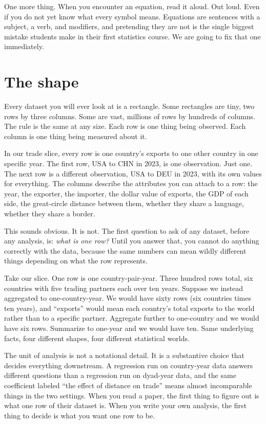 \documentclass[
  letterpaper,
  11pt,
  twoside,
  openany]{scrbook}
\begin{document}
One more thing. When you encounter an equation, read it aloud. Out loud.
Even if you do not yet know what every symbol means. Equations are
sentences with a subject, a verb, and modifiers, and pretending they are
not is the single biggest mistake students make in their first
statistics course. We are going to fix that one immediately.

\section{The shape}\label{the-shape}

Every dataset you will ever look at is a rectangle. Some rectangles are
tiny, two rows by three columns. Some are vast, millions of rows by
hundreds of columns. The rule is the same at any size. Each row is one
thing being observed. Each column is one thing being measured about it.

In our trade slice, every row is one country's exports to one other
country in one specific year. The first row, USA to CHN in 2023, is one
observation. Just one. The next row is a different observation, USA to
DEU in 2023, with its own values for everything. The columns describe
the attributes you can attach to a row: the year, the exporter, the
importer, the dollar value of exports, the GDP of each side, the
great-circle distance between them, whether they share a language,
whether they share a border.

This sounds obvious. It is not. The first question to ask of any
dataset, before any analysis, is: \emph{what is one row?} Until you
answer that, you cannot do anything correctly with the data, because the
same numbers can mean wildly different things depending on what the row
represents.

Take our slice. One row is one country-pair-year. Three hundred rows
total, six countries with five trading partners each over ten years.
Suppose we instead aggregated to one-country-year. We would have sixty
rows (six countries times ten years), and ``exports'' would mean each
country's total exports to the world rather than to a specific partner.
Aggregate further to one-country and we would have six rows. Summarize
to one-year and we would have ten. Same underlying facts, four different
shapes, four different statistical worlds.

The unit of analysis is not a notational detail. It is a substantive
choice that decides everything downstream. A regression run on
country-year data answers different questions than a regression run on
dyad-year data, and the same coefficient labeled ``the effect of
distance on trade'' means almost incomparable things in the two
settings. When you read a paper, the first thing to figure out is what
one row of their dataset is. When you write your own analysis, the first
thing to decide is what you want one row to be.
\end{document}
